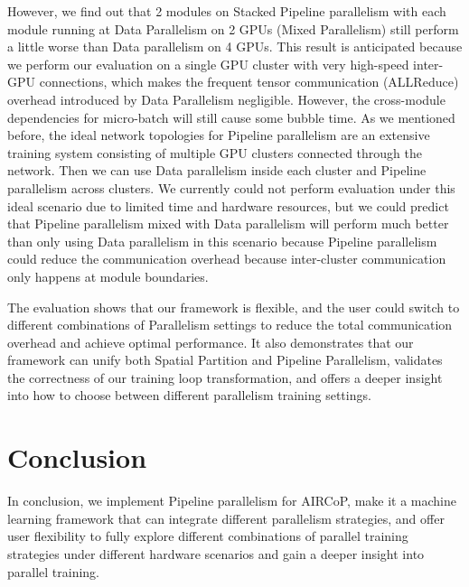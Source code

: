 \documentclass[sigplan, nonacm]{acmart}\settopmatter{printfolios=true,printccs=false,printacmref=false}
\begin{document}
 However, we find out that 2 modules on Stacked Pipeline parallelism with each module running at Data Parallelism on 2 GPUs (Mixed Parallelism) still perform a little worse than Data parallelism on 4 GPUs. This result is anticipated because we perform our evaluation on a single GPU cluster with very high-speed inter-GPU connections, which makes the frequent tensor communication (ALLReduce) overhead introduced by Data Parallelism negligible. However, the cross-module dependencies for micro-batch will still cause some bubble time. As we mentioned before, the ideal network topologies for Pipeline parallelism are an extensive training system consisting of multiple GPU clusters connected through the network. Then we can use Data parallelism inside each cluster and Pipeline parallelism across clusters. We currently could not perform evaluation under this ideal scenario due to limited time and hardware resources, but we could predict that Pipeline parallelism mixed with Data parallelism will perform much better than only using Data parallelism in this scenario because Pipeline parallelism could reduce the communication overhead because inter-cluster communication only happens at module boundaries.\par
 The evaluation shows that our framework is flexible, and the user could switch to different combinations of Parallelism settings to reduce the total communication overhead and achieve optimal performance. It also demonstrates that our framework can unify both Spatial Partition and Pipeline Parallelism, validates the correctness of our training loop transformation, and offers a deeper insight into how to choose between different parallelism training settings.
 \section{Conclusion} \label{conclusion}
In conclusion, we implement Pipeline parallelism for AIRCoP, make it a machine learning framework that can integrate different parallelism strategies, and offer user flexibility to fully explore different combinations of parallel training strategies under different hardware scenarios and gain a deeper insight into parallel training.


\end{document}
